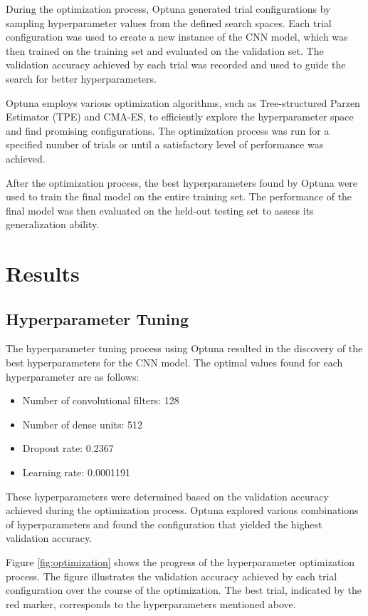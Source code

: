 \documentclass{article}
\begin{document}
During the optimization process, Optuna generated trial configurations by sampling hyperparameter values from the defined search spaces. Each trial configuration was used to create a new instance of the CNN model, which was then trained on the training set and evaluated on the validation set. The validation accuracy achieved by each trial was recorded and used to guide the search for better hyperparameters.

Optuna employs various optimization algorithms, such as Tree-structured Parzen Estimator (TPE) and CMA-ES, to efficiently explore the hyperparameter space and find promising configurations. The optimization process was run for a specified number of trials or until a satisfactory level of performance was achieved.

After the optimization process, the best hyperparameters found by Optuna were used to train the final model on the entire training set. The performance of the final model was then evaluated on the held-out testing set to assess its generalization ability.

\section{Results}

\subsection{Hyperparameter Tuning}
The hyperparameter tuning process using Optuna resulted in the discovery of the best hyperparameters for the CNN model. The optimal values found for each hyperparameter are as follows:

\begin{itemize}
    \item Number of convolutional filters: 128
    \item Number of dense units: 512
    \item Dropout rate: 0.2367
    \item Learning rate: 0.0001191
\end{itemize}

These hyperparameters were determined based on the validation accuracy achieved during the optimization process. Optuna explored various combinations of hyperparameters and found the configuration that yielded the highest validation accuracy.

Figure \ref{fig:optimization} shows the progress of the hyperparameter optimization process. The figure illustrates the validation accuracy achieved by each trial configuration over the course of the optimization. The best trial, indicated by the red marker, corresponds to the hyperparameters mentioned above.
\end{document}
